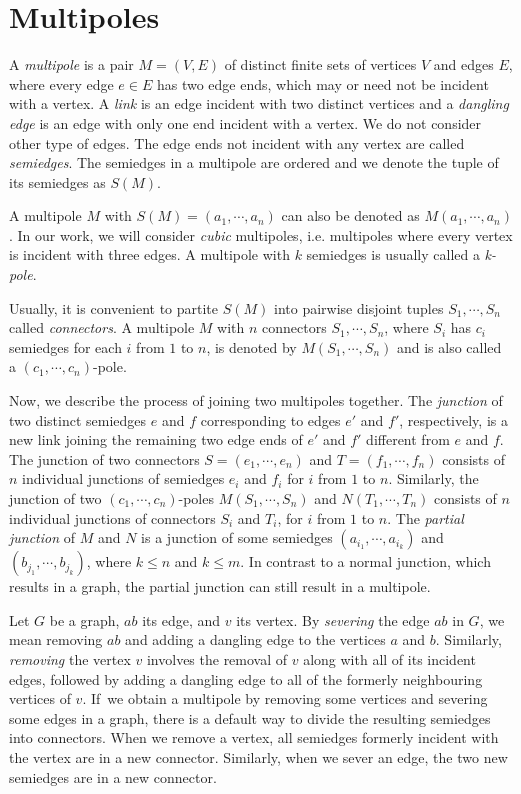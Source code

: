 \section{Multipoles}
\label{sec:multipoles}

A \textit{multipole} is a pair $M=(V,E)$ of distinct finite sets of vertices $V$ and edges $E$, where every edge $e\in E$ has two edge ends, which may or need not be incident with a vertex. A \emph{link} is an edge incident with two distinct vertices and a \emph{dangling edge} is an edge with only one end incident with a vertex. We do not consider other type of edges. The edge ends not incident with any vertex are called \textit{semiedges}. The semiedges in a multipole are ordered and we denote the tuple of its semiedges as $S(M)$.

A multipole $M$ with $S(M) = (a_1, \cdots, a_n)$ can also be denoted as $M(a_1,\cdots,a_n)$. In our work, we will consider \textit{cubic} multipoles, i.e. multipoles where every vertex is incident with three edges. 
A multipole with $k$ semiedges is usually called a \textit{k-pole}. 

Usually, it is convenient to partite $S(M)$ into pairwise disjoint tuples $S_1,\cdots, S_n$ called \textit{connectors}.
A multipole $M$ with $n$ connectors $S_1,\cdots,S_n$, where $S_i$ has $c_i$ semiedges for each $i$ from $1$ to $n$, is denoted by $M(S_1,\cdots,S_n)$ and is also called a $(c_1,\cdots,c_n)$-pole.

Now, we describe the process of joining two multipoles together.
The \textit{junction} of two distinct semiedges $e$ and $f$ corresponding to edges $e'$ and $f'$, respectively, is a new link joining the remaining two edge ends of $e'$ and $f'$ different from $e$ and $f$.
The junction of two connectors $S=(e_1,\cdots,e_n)$ and $T=(f_1,\cdots,f_n)$ consists of $n$ individual junctions of semiedges $e_i$ and $f_i$ for $i$ from $1$ to $n$.
Similarly, the junction of two $(c_1,\cdots,c_n)$-poles $M(S_1,\cdots,S_n)$ and $N(T_1,\cdots,T_n)$ consists of $n$ individual junctions of connectors $S_i$ and $T_i$, for $i$ from $1$ to $n$.
The \textit{partial junction} of $M$ and $N$ is a junction of some semiedges $(a_{i_1},\cdots, a_{i_k})$ and $(b_{j_1},\cdots, b_{j_k})$, where $k\leq n$ and $k\leq m$. In contrast to a normal junction, which results in a graph, the partial junction can still result in a multipole.

Let $G$ be a graph, $ab$ its edge, and $v$ its vertex. By \textit{severing} the edge $ab$ in $G$, we mean removing $ab$ and adding a dangling edge to the vertices $a$ and $b$. Similarly, \textit{removing} the vertex $v$ involves the removal of $v$ along with all of its incident edges, followed by adding a dangling edge to all of the formerly neighbouring vertices of $v$. If~we obtain a multipole by removing some vertices and severing some edges in a graph, there is a default way to divide the resulting semiedges into connectors. When we remove a vertex, all semiedges formerly incident with the vertex are in a new connector. Similarly, when we sever an edge, the two new semiedges are in a new connector.

